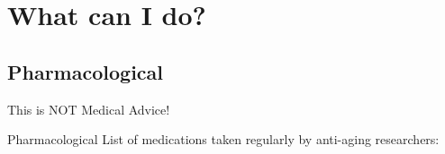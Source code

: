 \section{What can I do?}

\subsection{Pharmacological}

\addtocounter{framenumber}{1}
\begin{frame}[standout]
    \LARGE
    This is NOT Medical Advice!
\end{frame}

\begin{frame}[c]{Pharmacological}
    List of medications taken regularly by anti-aging researchers:


\end{frame}
